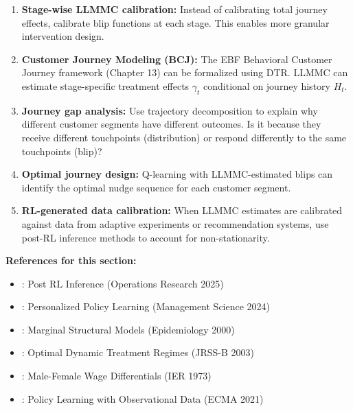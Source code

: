 \begin{enumerate}
\item \textbf{Stage-wise LLMMC calibration:}
Instead of calibrating total journey effects, calibrate blip functions at each stage.
This enables more granular intervention design.

\item \textbf{Customer Journey Modeling (BCJ):}
The EBF Behavioral Customer Journey framework (Chapter 13) can be formalized using
DTR. LLMMC can estimate stage-specific treatment effects $\gamma_t$ conditional on
journey history $H_t$.

\item \textbf{Journey gap analysis:}
Use trajectory decomposition to explain why different customer segments have different
outcomes. Is it because they receive different touchpoints (distribution) or respond
differently to the same touchpoints (blip)?

\item \textbf{Optimal journey design:}
Q-learning with LLMMC-estimated blips can identify the optimal nudge sequence for
each customer segment.

\item \textbf{RL-generated data calibration:}
When LLMMC estimates are calibrated against data from adaptive experiments or
recommendation systems, use post-RL inference methods \citep{syrgkanis2025postrl}
to account for non-stationarity.
\end{enumerate}

\textbf{References for this section:}
\begin{itemize}[nosep]
\item \citet{syrgkanis2025postrl}: Post RL Inference (Operations Research 2025)
\item \citet{zhang2024personalized}: Personalized Policy Learning (Management Science 2024)
\item \citet{robins2000msm}: Marginal Structural Models (Epidemiology 2000)
\item \citet{murphy2003optimal}: Optimal Dynamic Treatment Regimes (JRSS-B 2003)
\item \citet{oaxaca1973decomposition}: Male-Female Wage Differentials (IER 1973)
\item \citet{athey2021policy}: Policy Learning with Observational Data (ECMA 2021)
\end{itemize}



